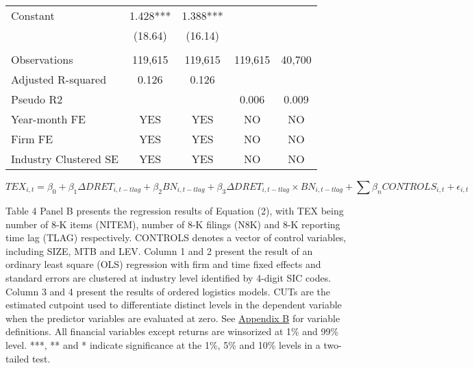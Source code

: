 \begin{table}[H]
\begin{center}
\begin{tabular}{lcccc}
			Constant & 1.428*** & 1.388*** &   &  \\
			& (18.64) & (16.14) &   &  \\
			&   &   &   &  \\
			Observations & 119,615 & 119,615 & 119,615 & 40,700 \\
			Adjusted R-squared & 0.126 & 0.126 &   &  \\
			Pseudo R2 &   &   & 0.006 & 0.009 \\
			Year-month FE & YES & YES & NO & NO \\
			Firm FE & YES & YES & NO & NO \\
			Industry Clustered SE & YES & YES & NO & NO \\
			\bottomrule
			\bottomrule
		\end{tabular}%
	\end{center}
		\begin{footnotesize}
			\setcounter{equation}{1}
			\begin{equation}
				TEX_{i,t}=\beta_0+\beta_1\Delta DRET_{i,t-tlag}+\beta_2BN_{i,t-tlag}+\beta_3\Delta DRET_{i,t-tlag}\times 	BN_{i,t-tlag}+\sum\beta_nCONTROLS_{i,t}+\epsilon_{i,t}
			\end{equation}
			
			\noindent Table 4 Panel B presents the regression results of Equation (2), with TEX being number of 8-K items (NITEM), number of 8-K filings (N8K) and 8-K reporting time lag (TLAG) respectively. CONTROLS denotes a vector of control variables, including SIZE, MTB and LEV. Column 1 and 2 present the result of an ordinary least square (OLS) regression with firm and time fixed effects and standard errors are clustered at industry level identified by 4-digit SIC codes. Column 3 and 4 present the results of ordered logistics models. CUTs are the estimated cutpoint used to differentiate distinct levels in the dependent variable when the predictor variables are evaluated at zero. See \hyperref[appb]{Appendix B} for variable definitions. All financial variables except returns are winsorized at 1\% and 99\% level. ***, ** and * indicate significance at the 1\%, 5\% and 10\% levels in a two-tailed test. 
		\end{footnotesize}
\end{table}%
